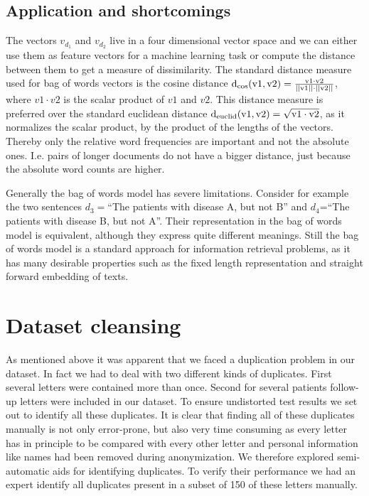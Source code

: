 \subsection*{Application and shortcomings}
The vectors $v_{d_1}$ and $v_{d_2}$ live in a four dimensional vector space and we can either use them as feature vectors for a machine learning task or compute the distance between them to get a measure of dissimilarity. The standard distance measure used for bag of words vectors is the cosine distance $\rm{d_{\cos}}(v1, v2)=\frac{v1\cdot v2}{||v1||\cdot ||v2||}$, where $v1\cdot v2$ is the scalar product of $v1$ and $v2$. This distance measure is preferred over the standard euclidean distance $\rm{d_{euclid}}(v1, v2)=\sqrt{v1\cdot v2}$, as it normalizes the scalar product, by the product of the lengths of the vectors. Thereby only the relative word frequencies are important and not the absolute ones. I.e. pairs of longer documents do not have a bigger distance, just because the absolute word counts are higher. 

Generally the bag of words model has severe limitations. Consider for example
the two sentences $d_{3}=$``The patients with disease A, but not B'' and $d_{4}$=``The patients with disease B, but not A''. Their representation in the bag of words model is equivalent,
although they express quite different meanings. Still the bag of words
model is a standard approach for information retrieval problems, as
it has many desirable properties such as the fixed length representation and straight forward embedding of texts.



\section{Dataset cleansing}

As mentioned above it was apparent that we faced a duplication problem in our dataset. In fact we had to deal with two different kinds of duplicates. First several letters were contained more than once. Second for several patients follow-up letters were included in our dataset. To ensure undistorted test results we set out to identify all these duplicates. It is clear that finding all of these duplicates manually is not only error-prone, but also very time consuming as every letter has in principle to be compared with every other letter and personal information like names had been removed during anonymization. We therefore explored semi-automatic aids for identifying duplicates. To verify their performance we had an expert identify all duplicates present in a subset of 150 of these letters manually.

